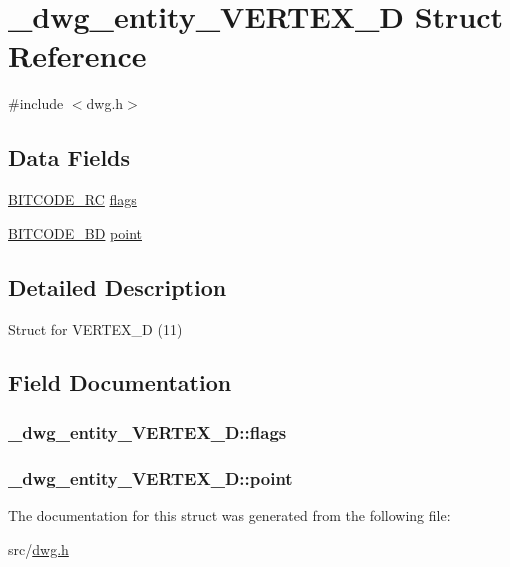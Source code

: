 \hypertarget{struct__dwg__entity__VERTEX__3D}{\section{\-\_\-dwg\-\_\-entity\-\_\-\-V\-E\-R\-T\-E\-X\-\_\-D \-Struct \-Reference}
\label{struct__dwg__entity__VERTEX__3D}
}


{\ttfamily \#include $<$dwg.\-h$>$}

\subsection*{\-Data \-Fields}
\begin{DoxyCompactItemize}
\item 
\hyperlink{dwg_8h_a7fd199a8f9c9cc52bdab220f65a2a619}{\-B\-I\-T\-C\-O\-D\-E\-\_\-\-R\-C} \hyperlink{struct__dwg__entity__VERTEX__3D_a59eee860a5fc108296e56180d5f60d4f}{flags}
\item 
\hyperlink{dwg_8h_a00698ef1bb072aa0a9360c6fc1c57587}{\-B\-I\-T\-C\-O\-D\-E\-\_\-B\-D} \hyperlink{struct__dwg__entity__VERTEX__3D_a9e73178cd1c214da0d2b71dc19a3a9cc}{point}
\end{DoxyCompactItemize}


\subsection{\-Detailed \-Description}
\-Struct for \-V\-E\-R\-T\-E\-X\-\_\-D (11) 

\subsection{\-Field \-Documentation}
\hypertarget{struct__dwg__entity__VERTEX__3D_a59eee860a5fc108296e56180d5f60d4f}{
\subsubsection[{flags}]{ {\bf \-\_\-dwg\-\_\-entity\-\_\-\-V\-E\-R\-T\-E\-X\-\_\-D\-::flags}}}\label{struct__dwg__entity__VERTEX__3D_a59eee860a5fc108296e56180d5f60d4f}
\hypertarget{struct__dwg__entity__VERTEX__3D_a9e73178cd1c214da0d2b71dc19a3a9cc}{
\subsubsection[{point}]{ {\bf \-\_\-dwg\-\_\-entity\-\_\-\-V\-E\-R\-T\-E\-X\-\_\-D\-::point}}}\label{struct__dwg__entity__VERTEX__3D_a9e73178cd1c214da0d2b71dc19a3a9cc}


\-The documentation for this struct was generated from the following file\-:\begin{DoxyCompactItemize}
\item 
src/\hyperlink{dwg_8h}{dwg.\-h}\end{DoxyCompactItemize}

